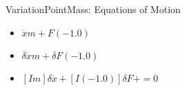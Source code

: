 VariationPointMass: Equations of Motion
\begin{itemize}
\item $\ddot{x} m+F (-1.0)$
\item $\delta \ddot{x} m+\delta F (-1.0)$
\item $[I m]\delta \ddot{x}+[I (-1.0)]\delta F+=0$
\end{itemize}